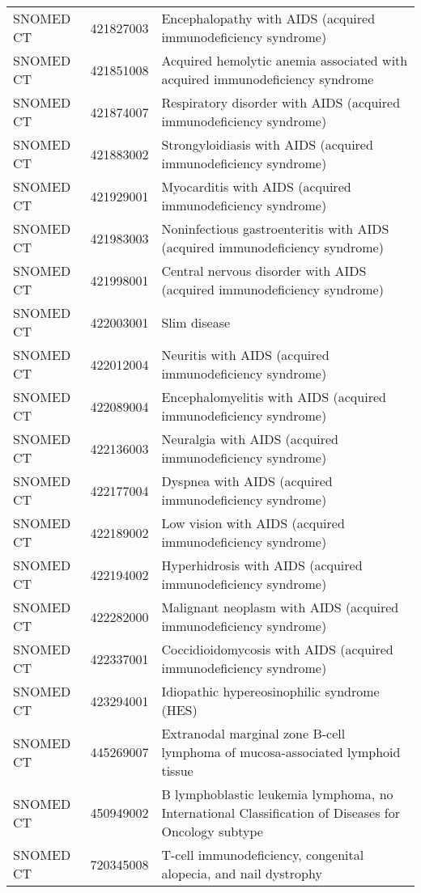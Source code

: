 \begin{table}[ht]
\begin{tabular}{lll}
  SNOMED CT & 421827003 & Encephalopathy with AIDS (acquired immunodeficiency syndrome) \\ 
  SNOMED CT & 421851008 & Acquired hemolytic anemia associated with acquired immunodeficiency syndrome \\ 
  SNOMED CT & 421874007 & Respiratory disorder with AIDS (acquired immunodeficiency syndrome) \\ 
  SNOMED CT & 421883002 & Strongyloidiasis with AIDS (acquired immunodeficiency syndrome) \\ 
  SNOMED CT & 421929001 & Myocarditis with AIDS (acquired immunodeficiency syndrome) \\ 
  SNOMED CT & 421983003 & Noninfectious gastroenteritis with AIDS (acquired immunodeficiency syndrome) \\ 
  SNOMED CT & 421998001 & Central nervous disorder with AIDS (acquired immunodeficiency syndrome) \\ 
  SNOMED CT & 422003001 & Slim disease \\ 
  SNOMED CT & 422012004 & Neuritis with AIDS (acquired immunodeficiency syndrome) \\ 
  SNOMED CT & 422089004 & Encephalomyelitis with AIDS (acquired immunodeficiency syndrome) \\ 
  SNOMED CT & 422136003 & Neuralgia with AIDS (acquired immunodeficiency syndrome) \\ 
  SNOMED CT & 422177004 & Dyspnea with AIDS (acquired immunodeficiency syndrome) \\ 
  SNOMED CT & 422189002 & Low vision with AIDS (acquired immunodeficiency syndrome) \\ 
  SNOMED CT & 422194002 & Hyperhidrosis with AIDS (acquired immunodeficiency syndrome) \\ 
  SNOMED CT & 422282000 & Malignant neoplasm with AIDS (acquired immunodeficiency syndrome) \\ 
  SNOMED CT & 422337001 & Coccidioidomycosis with AIDS (acquired immunodeficiency syndrome) \\ 
  SNOMED CT & 423294001 & Idiopathic hypereosinophilic syndrome (HES) \\ 
  SNOMED CT & 445269007 & Extranodal marginal zone B-cell lymphoma of mucosa-associated lymphoid tissue \\ 
  SNOMED CT & 450949002 & B lymphoblastic leukemia lymphoma, no International Classification of Diseases for Oncology subtype \\ 
  SNOMED CT & 720345008 & T-cell immunodeficiency, congenital alopecia, and nail dystrophy \\ 

\end{tabular}
\end{table}
